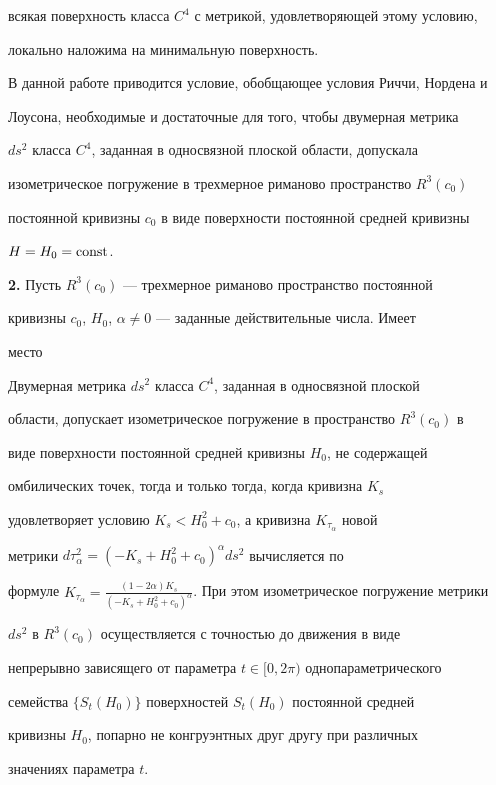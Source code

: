 всякая поверхность класса $C^4$ с метрикой, удовлетворяющей этому условию, 


локально наложима на минимальную поверхность. 


 


В данной работе приводится условие, обобщающее условия Риччи, Нордена и 


Лоусона, необходимые и достаточные для того, чтобы двумерная метрика 


$ds^2$ класса $C^4$, заданная в односвязной плоской области, допускала 


изометрическое погружение в трехмерное риманово пространство $R^3(c_0)$ 


постоянной кривизны $c_0$ в виде поверхности постоянной средней кривизны 


$H=H_0=\operatorname{const}$. 


\medskip 


 


{\bf 2.} Пусть $R^3(c_0)$ --- трехмерное риманово пространство постоянной 


кривизны $c_0$, $H_0$, $\alpha\ne0$ --- заданные действительные числа. Имеет 


место 


 


\begin{thmnonum} 


Двумерная метрика $ds^2$ класса $C^4$, заданная в односвязной плоской 


области, допускает изометрическое погружение в пространство $R^3(c_0)$ в 


виде поверхности постоянной средней кривизны $H_0$, не содержащей 


омбилических точек, тогда и только тогда, когда кривизна $K_s$ 


удовлетворяет условию $K_s<H^2_0+c_0$, а кривизна $K_{\tau_\alpha}$ новой 


метрики $d\tau^2_\alpha=(-K_s+H^2_0+c_0)^\alpha ds^2$ вычисляется по 


формуле $K_{\tau_\alpha}=\frac{(1-2\alpha)K_s} 


{(-K_s+H^2_0+c_0)^\alpha}$. При этом изометрическое погружение метрики 


$ds^2$ в $R^3(c_0)$ осуществляется с точностью до движения в виде 


непрерывно зависящего от параметра $t\in[0,2\pi)$ однопараметрического 


семейства $\{S_t(H_0)\}$ поверхностей $S_t(H_0)$ постоянной средней 


кривизны $H_0$, попарно не конгруэнтных друг другу при различных 


значениях параметра $t$. 


\end{thmnonum} 


